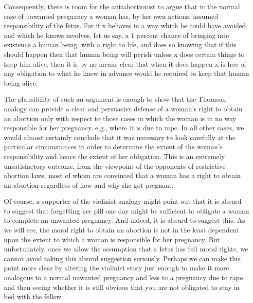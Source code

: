 Consequently, there is room for the antiabortionist to
argue that in the normal case of unwanted pregnancy a
woman has, by her own actions, assumed responsibility of
the fetus. For if x behaves in a way which he could have
avoided, and which he knows involves, let us say, a 1
percent chance of bringing into existence a human being,
with a right to life, and does so knowing that if this should
happen then that human being will perish unless x does
certain things to keep him alive, then it is by no means
clear that when it does happen x is free of any obligation
to what he knew in advance would he required to keep
that human being alive.

The plausibility of such an argument is enough to show
that the Thomson analogy can provide a clear and
persuasive defense of a woman’s right to obtain an
abortion only with respect to those cases in which the
woman is in no way responsible for her pregnancy, e.g.,
where it is due to rape. In all other cases, we would
almost certainly conclude that it was necessary to look
carefully at the particular circumstances in order to
determine the extent of the woman’s responsibility and
hence the extent of her obligation. This is an extremely
unsatisfactory outcome, from the viewpoint of the
opponents of restrictive abortion laws, most of whom are
convinced that a woman has a right to obtain an abortion
regardless of how and why she got pregnant.

Of course, a supporter of the violinist analogy might point
out that it is absurd to suggest that forgetting her pill one
day might be sufficient to obligate a woman to complete
an unwanted pregnancy. And indeed, it is absurd to
suggest this. As we will see, the moral right to obtain an
abortion is not in the least dependent upon the extent to
which a woman is responsible for her pregnancy. But
unfortunately, once we allow the assumption that a fetus
has full moral rights, we cannot avoid taking this absurd
suggestion seriously. Perhaps we can make this point
more clear by altering the violinist story just enough to
make it more analogous to a normal unwanted pregnancy
and less to a pregnancy due to rape, and then seeing
whether it is still obvious that you are not obligated to
stay in bed with the fellow.

